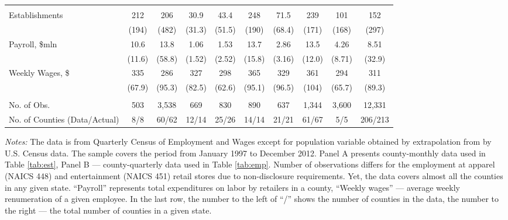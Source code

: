 \documentclass[12pt]{article}
\begin{document}
\begin{landscape}
\begin{table}
\begin{threeparttable}
\begin{tabular}{lccccccccc}
						\hline \noalign{\smallskip} \multicolumn{10}{c}{\textbf{Panel B: Apparel Retailers, Data at County-Quarterly Level}}\\ \noalign{\smallskip}
						
						Establishments & 212 & 206 & 30.9 & 43.4 & 248 & 71.5 & 239 & 101 & 152\\
						& (194) & (482) & (31.3) & (51.5) & (190) & (68.4) & (171) & (168) & (297)\\
						Payroll, \$mln  & 10.6 & 13.8 & 1.06 & 1.53 & 13.7 & 2.86 & 13.5 & 4.26 & 8.51\\
						& (11.6) & (58.8) & (1.52) & (2.52) & (15.8) & (3.16) & (12.0) & (8.71) & (32.9)\\

						Weekly Wages, \$ & 335 & 286 & 327 & 298 & 365 & 329 & 361 & 294 & 311\\
						& (67.9) & (95.3) & (82.5) & (62.6) & (95.1) & (96.5) & (104) & (65.7) & (89.3)\\
						& & & & & & & & & \\
						No. of Obs. & 503 & 3,538 & 669 & 830 & 890 & 637 & 1,344 & 3,600 & 12,331\\
						No. of Counties (Data/Actual) & 8/8 & 60/62 & 12/14 & 25/26  & 14/14 & 21/21 & 61/67  & 5/5 &  206/213 \\ \hline
						
						\hline\end{tabular}
					\begin{tablenotes}
						\small \emph{Notes:} The data is from Quarterly Census  of Employment and Wages except for population variable obtained by extrapolation from by U.S. Census data. The sample covers the period from January 1997 to December 2012. Panel A presents county-monthly data used in Table \ref{tab:est}, Panel B --- county-quarterly data used in Table \ref{tab:emp}. Number of observations differs for the employment at apparel (NAICS 448) and entertainment (NAICS 451) retail stores due to non-disclosure requirements. Yet, the data covers almost all the counties in any given state. ``Payroll'' represents total expenditures on labor by retailers in a county, ``Weekly wages'' --- average weekly renumeration of a given employee. In the last row, the number to the left of ``/'' shows the number of counties in the data, the number to the right --- the total number of counties in a given state.
					\end{tablenotes}
				\end{threeparttable}
			\end{table}	
		\end{landscape}
		
\end{document}
